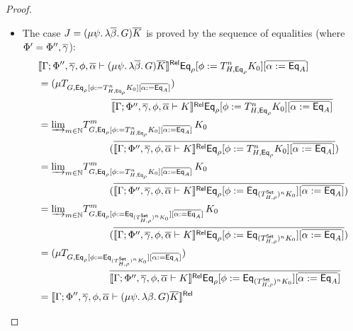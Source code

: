 \documentclass[runningheads]{llncs}
\newcommand{\set}{\mathsf{Set}}
\begin{document}
\begin{proof}
\begin{itemize}
\begin{itemize}
\item 
  The case $J = (\mu \psi.\, \lambda \overline{\beta}.\, G) \overline{K}$
is proved by the sequence of equalities (where $\Phi' = \Phi'', \overline{\gamma}$):
\[
\begin{split}
& \relsem{\Gamma; \Phi'', \ol\gamma, \phi, \ol{\alpha} \vdash (\mu \psi.\, \lambda \ol{\beta}.\, G) \ol{K}}
  \Eq_{\rho} [\phi := T^{n}_{H,\Eq_{\rho}} K_0]
  [\overline{\alpha := \Eq_A}] \\
&= (\mu {T_{G, \Eq_{\rho}[\phi := T^{n}_{H,\Eq_{\rho}} K_0][\overline{\alpha := \Eq_A}]}}) \\
  &\hspace*{1in} 
  \,\ol{\relsem{\Gamma; \Phi'', \ol\gamma, \phi, \ol{\alpha} \vdash K}\Eq_{\rho}
  [\phi := T^{n}_{H,\Eq_{\rho}} K_0][\overline{\alpha := \Eq_A}]} \\ 
&= \colim{m \in \nat} {T^m_{G, \Eq_{\rho}[\phi := T^{n}_{H,\Eq_{\rho}} K_0][\overline{\alpha := \Eq_A}]}}\,K_0 \\
  \, 
  &\hspace*{1in} 
  (\ol{\relsem{\Gamma; \Phi'', \ol\gamma, \phi, \ol{\alpha} \vdash K}\Eq_{\rho}
  [\phi := T^{n}_{H,\Eq_{\rho}} K_0][\overline{\alpha := \Eq_A}]}) \\ 
&= \colim{m \in \nat} {T^m_{G, \Eq_{\rho}[\phi := T^{n}_{H,\Eq_{\rho}} K_0][\overline{\alpha := \Eq_A}]}}\,K_0 \\
  \,
  &\hspace*{1in} 
  (\ol{\relsem{\Gamma; \Phi'', \ol\gamma, \phi, \ol{\alpha} \vdash K}\Eq_{\rho}
  [\phi := \Eq_{(T^{\set}_{H,\rho})^n K_0}][\overline{\alpha := \Eq_A}]}) \\  %
&= \colim{m \in \nat} {T^m_{G, \Eq_{\rho}[\phi := \Eq_{(T^{\set}_{H,\rho})^n K_0}][\overline{\alpha := \Eq_A}]}}\,K_0 \\
  \, 
  &\hspace*{1in} 
  (\ol{\relsem{\Gamma; \Phi'', \ol\gamma, \phi, \ol{\alpha} \vdash K}\Eq_{\rho}
  [\phi := \Eq_{(T^{\set}_{H,\rho})^n K_0}][\overline{\alpha := \Eq_A}]}) \\ 
&= (\mu {T_{G, \Eq_{\rho}[\phi := \Eq_{(T^{\set}_{H,\rho})^n K_0}][\overline{\alpha := \Eq_A}]}}) \\
  \, 
  &\hspace*{1in} 
  \ol{\relsem{\Gamma; \Phi'', \ol\gamma, \phi, \ol{\alpha} \vdash K}\Eq_{\rho}
  [\phi := \Eq_{(T^{\set}_{H,\rho})^n K_0}][\overline{\alpha := \Eq_A}]} \\ 
&= \relsem{\Gamma; \Phi'', \ol\gamma, \phi, \ol{\alpha} \vdash (\mu \psi.\, \lambda \beta.\, G) \ol{K}} 

\end{split}\]
\end{itemize}
\end{itemize}
\end{proof}
\end{document}
